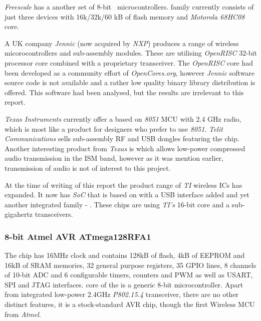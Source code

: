  \emph{Freescale} has a another set of 8-bit \WPAN\ microcontrollers.
  family currently consists of just three devices with
 16k/32k/60 kB of flash memory and \emph{Motorola 68HC08} core.

 A UK company \emph{Jennic} (now acquired by \emph{NXP}) produces a
 range of wireless micorocontrollers and sub-assembly modules. These
 are utilising \emph{OpenRISC} 32-bit processor core combined with a
 proprietary transceiver. The \emph{OpenRISC} core had been developed
 as a community effort of \emph{OpenCores.org}, however \emph{Jennic}
 software source code is not available and a rather low quality binary
 library distribution is offered. This software had been analysed, but
 the results are irrelevant to this report.

 \emph{Texas Instruments} currently offer a  based on
 \emph{8051} MCU with 2.4 GHz radio, which is most like a product for
 designers who prefer to use \emph{8051}. \emph{Telit Communications}
 sells sub-assembly RF and USB dongles featuring the  chip.
 Another interesting product from \emph{Texas} is  which
 allows low-power compressed audio transmission in the ISM band, however
 as it was mention earlier, transmission of audio is not of interest
 to this project.

 At the time of writing of this report the product range of \emph{TI}
 wireless ICs has expanded. It now has  \emph{SoC}
 that is based on  with a USB interface added and
 yet another integrated family - . These chips are using
 \emph{TI's}  16-bit core and a sub-gigahertz 
 transceivers.

\subsubsection{8-bit Atmel AVR ATmega128RFA1}

 The  \cite{atmel:atmega128rfa1:datasheet} chip
 has 16MHz clock and contains 128kB of flash, 4kB of EEPROM and 16kB
 of SRAM memories, 32 general purpose registers, 35 GPIO lines, 8
 channels of 10-bit ADC and 6 configurable timers, counters and PWM
 as well as USART, SPI and JTAG interfaces.  core
 of the  is a generic 8-bit microcontroller.
 Apart from integrated  \cite{atmel:at86rf231:datasheet}
 low-power 2.4GHz \emph{P802.15.4} transceiver, there are no other
 distinct features, it is a stock-standard AVR chip, though the first
 Wireless MCU from \emph{Atmel}.

